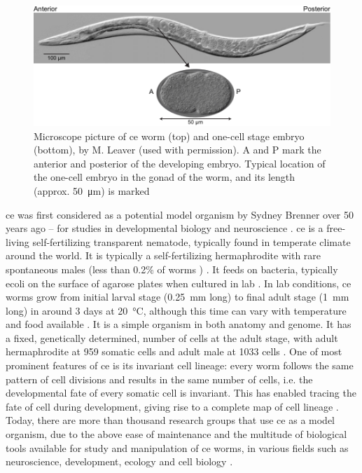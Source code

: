 \begin{figure}[h]
    \centering
    \includegraphics{Introduction/FigureWorm/worm.pdf}
    \caption[\acs{ce} worm and one-cell embryo]{Microscope picture of \acs{ce} worm (top) and one-cell stage embryo (bottom), by M. Leaver (used with permission). A and P mark the anterior and posterior of the developing embryo. Typical location of the one-cell embryo in the gonad of the worm, and its length (approx. \SI{50}{\micro\meter}) is marked}
    \label{fig:celegansWormModelOrganism}
\end{figure}

\acf{ce} was first considered as a potential model organism by Sydney Brenner over \num{50} years ago -- for studies in developmental biology and neuroscience \citep{wb1988nematode,brenner1974genetics,brenner2003nature}.  \ac{ce} is a free-living self-fertilizing transparent nematode, typically found in temperate climate around the world. It is typically a self-fertilizing hermaphrodite with rare spontaneous males (less than \num{0.2}\% of worms \citep{haag2005evolution,corsi2015transparent}) \citep{brenner1974genetics}. It feeds on bacteria, typically \ac{ecoli} on the surface of agarose plates when cultured in lab \citep{brenner1974genetics}. In lab conditions, \ac{ce} worms grow from initial larval stage (\SI{0.25}{\milli\meter} long) to final adult stage (\SI{1}{\milli\meter} long) in around \num{3} days at \SI{20}{\celsius}, although this time can vary with temperature and food available \citep{corsi2015transparent,brenner1974genetics,lee2009regulation}. It is a simple organism in both anatomy and genome. It has a fixed, genetically determined, number of cells at the adult stage, with adult hermaphrodite at 959 somatic cells and adult male at 1033 cells \citep{sulston1983embryonic,kimble1979postembryonic}. One of most prominent features of \ac{ce} is its invariant cell lineage: every worm follows the same pattern of cell divisions and results in the same number of cells, i.e. the developmental fate of every somatic cell is invariant. This has enabled tracing the fate of cell during development, giving rise to a complete map of cell lineage \citep{sulston1983embryonic,sulston1975dopaminergic,kimble1979postembryonic}. Today, there are more than thousand research groups that use \ac{ce} as a model organism, due to the above ease of maintenance and the multitude of biological tools available for study and manipulation of \ac{ce} worms, in various fields such as neuroscience, development, ecology and cell biology \citep{corsi2015transparent}.

